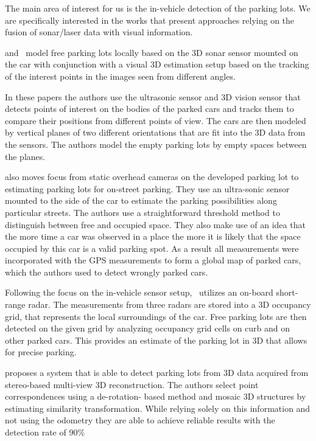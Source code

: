 The main area of interest for us is the in-vehicle detection of the parking
lots. We are specifically interested in the works that present approaches
relying on the fusion of sonar/laser data with visual information.

\cite{fintyelvestri} and~\cite{abadvestri} model free parking lots locally
based on the 3D sonar sensor mounted on the car with conjunction with a visual
3D estimation setup based on the tracking of the interest points in the images
seen from different angles.

In these papers the authors use the ultrasonic sensor and 3D vision sensor
that detects points of interest on the bodies of the parked cars and tracks
them to compare their positions from different points of view. The cars are
then modeled by vertical planes of two different orientations that are fit
into the 3D data from the sensors. The authors model the empty parking lots by
empty spaces between the planes.

\cite{vladimircoric} also moves focus from static overhead cameras on the
developed parking lot to estimating parking lots for on-street parking. They
 use an ultra-sonic sensor mounted to the side of the car to
estimate the parking possibilities along particular streets. The authors use a
straightforward threshold method to distinguish between free and occupied
space. They also make use of an idea that the more time a car was observed in
a place the more it is likely that the space occupied by this car is a valid
parking spot. As a result all measurements were incorporated with the GPS
measurements to form a global map of parked cars, which the authors used to
detect wrongly parked cars.

Following the focus on the in-vehicle sensor setup,~\cite{schmid11} utilizes
an on-board short-range radar. The measurements from three radars are stored
into a 3D occupancy grid, that represents the local surroundings of the car.
Free parking lots are then detected on the given grid by analyzing occupancy
grid cells on curb and on other parked cars. This provides an estimate of the
parking lot in 3D that allows for precise parking.

\cite{suhr10} proposes a system that is able to detect parking lots from 3D
data acquired from stereo-based multi-view 3D reconstruction. The authors
select point correspondences using a de-rotation- based method and mosaic 3D
structures by estimating similarity transformation. While relying solely on
this information and not using the odometry they are able to achieve reliable
results with the detection rate of 90\%


